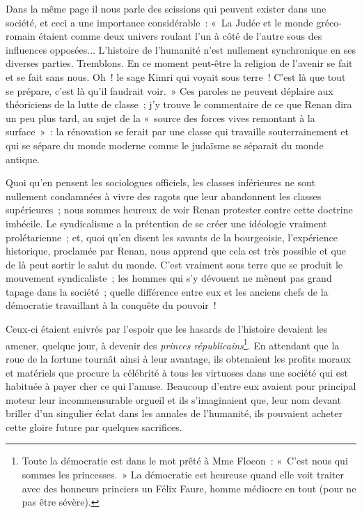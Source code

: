 \documentclass[french,twoside]{book} %
\begin{document}
Dans la même page il nous parle des scissions qui peuvent exister dans une société, et ceci a une importance considérable : « La Judée et le monde gréco-romain étaient comme deux univers roulant l’un à côté de l’autre sous des influences opposées... L’histoire de l’humanité n’est nullement synchronique en ses diverses parties. Tremblons. En ce moment peut-être la religion de l’avenir se fait et se fait sans nous. Oh ! le sage Kimri qui voyait sous terre ! C’est là que tout se prépare, c’est là qu’il faudrait voir. » Ces paroles ne peuvent déplaire aux théoriciens de la lutte de classe ; j’y trouve le commentaire de ce que Renan dira un peu plus tard, au sujet de la « source des forces vives remontant à la surface » : la rénovation se ferait par une classe qui travaille souterrainement et qui se sépare du monde moderne comme le judaïsme se séparait du monde antique.\par
Quoi qu’en pensent les sociologues officiels, les classes inférieures ne sont nullement condamnées à vivre des ragots que leur abandonnent les classes supérieures ; nous sommes heureux de voir Renan protester contre cette doctrine imbécile. Le syndicalisme a la prétention de se créer une idéologie vraiment prolétarienne ; et, quoi qu’en disent les savants de la bourgeoisie, l’expérience  historique, proclamée par Renan, nous apprend que cela est très possible et que de là peut sortir le salut du monde. C’est vraiment sous terre que se produit le mouvement syndicaliste ; les hommes qui s’y dévouent ne mènent pas grand tapage dans la société ; quelle différence entre eux et les anciens chefs de la démocratie travaillant à la conquête du pouvoir !\par
Ceux-ci étaient enivrés par l’espoir que les hasards de l’histoire devaient les amener, quelque jour, à devenir des \emph{princes républicains}\footnote{ \noindent Toute la démocratie est dans le mot prêté à Mme Flocon : « C’est nous qui sommes les princesses. » La démocratie est heureuse quand elle voit traiter avec des honneurs princiers un Félix Faure, homme médiocre en tout (pour ne pas être sévère).
 }. En attendant que la roue de la fortune tournât ainsi à leur avantage, ils obtenaient les profits moraux et matériels que procure la célébrité à tous les virtuoses dans une société qui est habituée à payer cher ce qui l’amuse. Beaucoup d’entre eux avaient pour principal moteur leur incommensurable orgueil et ils s’imaginaient que, leur nom devant briller d’un singulier éclat dans les annales de l’humanité, ils pouvaient acheter cette gloire future par quelques sacrifices.\par
\end{document}
